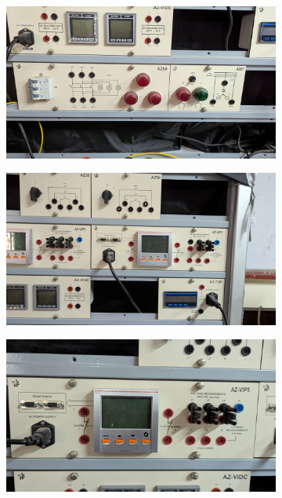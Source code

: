 \documentclass[a4paper,12pt]{article}
\begin{document}
	\begin{figure}[H]
		\centering
		\begin{subfigure}[t]{.32\textwidth}
			\centering
			\includegraphics[width=1\linewidth]{Images/15}
			\caption{ }
			\vspace{0.1cm}
		\end{subfigure}
		\hfill
		\begin{subfigure}[t]{.32\textwidth}
			\centering
			\includegraphics[width=1\linewidth]{Images/16}
			\caption{ }
		\end{subfigure}
		\hfill
		\begin{subfigure}[t]{.32\textwidth}
			\centering
			\includegraphics[width=1\linewidth]{Images/17}
			\caption{ }
		\end{subfigure}
	\end{figure}
\end{document}

